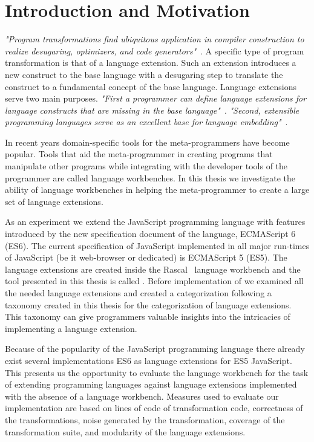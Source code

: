 
\chapter{Introduction and Motivation}

\label{Chapter1}


\textit{"Program transformations find ubiquitous application in compiler construction to realize desugaring, optimizers, and code generators"}~\cite{Erdweg2014}. A specific type of program transformation is that of a language extension. Such an extension introduces a new construct to the base language with a desugaring step to translate the construct to a fundamental concept of the base language. Language extensions serve two main purposes. \textit{"First a programmer can define language extensions for language constructs that are missing in the base language"}~\cite{Erdweg2013}. \textit{"Second, extensible programming languages serve as an excellent base for language embedding"}~\cite{Erdweg2013}. 

In recent years domain-specific tools for the meta-programmers have become popular. Tools that aid the meta-programmer in creating programs that manipulate other programs while integrating with the developer tools of the programmer are called language workbenches. In this thesis we investigate the ability of language workbenches in helping the meta-programmer to create a large set of language extensions. 

As an experiment we extend the JavaScript programming language with features introduced by the new specification document of the language, ECMAScript 6 (ES6). The current specification of JavaScript implemented in all major run-times of JavaScript (be it web-browser or dedicated) is ECMAScript 5 (ES5). The language extensions are created inside the Rascal~\cite{Klinta} language workbench and the tool presented in this thesis is called \projectname. Before implementation of \projectname we examined all the needed language extensions and created a categorization following a taxonomy created in this thesis for the categorization of language extensions. This taxonomy can give programmers valuable insights into the intricacies of implementing a language extension.

Because of the popularity of the JavaScript programming language there already exist several implementations ES6 as language extensions for ES5 JavaScript. This presents us the opportunity to evaluate the language workbench for the task of extending programming languages against language extensions implemented with the absence of a language workbench.  
Measures used to evaluate our implementation are based on lines of code of transformation code, correctness of the transformations, noise generated by the transformation, coverage of the transformation suite, and modularity of the language extensions.

